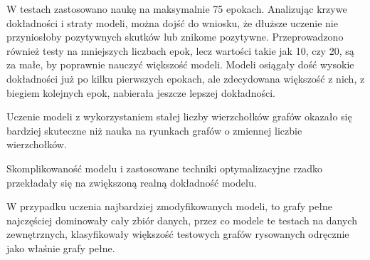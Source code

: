 W testach zastosowano naukę na maksymalnie 75 epokach.
Analizując krzywe dokładności i straty modeli, można dojść do wniosku,
że dłuższe uczenie nie przyniosłoby pozytywnych skutków lub znikome pozytywne.
Przeprowadzono również testy na mniejszych liczbach epok, lecz wartości takie jak 10, czy 20,
są za małe, by poprawnie nauczyć większość modeli.
Modeli osiągały dość wysokie dokładności już po kilku pierwszych epokach,
ale zdecydowana większość z nich, z biegiem kolejnych epok, nabierała jeszcze lepszej dokładności.

Uczenie modeli z wykorzystaniem stałej liczby wierzchołków grafów okazało się bardziej skuteczne
niż nauka na ryunkach grafów o zmiennej liczbie wierzchołków.

Skomplikowaność modelu i zastosowane techniki optymalizacyjne rzadko przekładały się na zwiększoną realną dokładność modelu.

W przypadku uczenia najbardziej zmodyfikowanych modeli, to grafy pełne najczęściej dominowały cały zbiór danych,
przez co modele te testach na danych zewnętrznych, klasyfikowały większość testowych grafów rysowanych odręcznie jako właśnie grafy pełne.